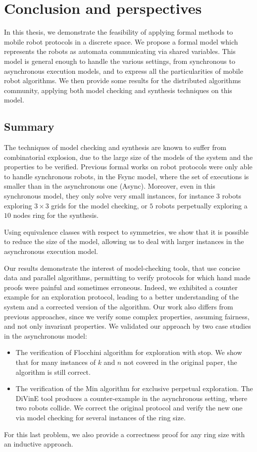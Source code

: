 
\chapter{Conclusion and perspectives}
In this thesis, we demonstrate the feasibility of applying formal methods to mobile robot protocols in a discrete space.
We propose a formal model which represents the robots as automata communicating via shared variables. 
This model is general enough to handle the various settings, from synchronous to asynchronous execution models, and to express all the particularities of mobile robot algorithms.
We then provide some results for the distributed algorithms community, applying both model checking and synthesis techniques on this model.
\section*{Summary}

The techniques of model checking and synthesis are known to suffer from combinatorial explosion, due to the large size of the models of the system and the properties to be verified. 
Previous formal works on robot protocols were only able to handle synchronous robots, in the Fsync model, where the set of executions is smaller than in the asynchronous one (Async). 
Moreover, even in this synchronous model, they only solve very small instances, for instance 3 robots exploring $3\times 3$ grids for the model checking, or $5$ robots perpetually exploring a $10$ nodes ring for the synthesis.

Using equivalence classes with respect to symmetries, we show that it is possible to reduce the size of the model, 
allowing us to deal with  larger instances in the asynchronous execution model.

Our results demonstrate the interest of model-checking tools, that use concise data and parallel algorithms, 
permitting to verify protocols for which hand made proofs were painful 
and sometimes erroneous. Indeed, we exhibited a counter example for an exploration protocol, leading to a better understanding of the system 
and a corrected version of the algorithm. Our work also differs from previous approaches, since we verify some complex properties, assuming fairness, and not only invariant properties. 
We validated our approach by two case studies in the asynchronous model: 
\begin{itemize}
\item The verification of Flocchini algorithm for exploration with stop.
We show that for many instances of $k$ and $n$ not covered in the original paper, the algorithm is still correct.
\item The verification of the Min algorithm for exclusive perpetual exploration. 
The DiVinE tool produces a counter-example in the asynchronous setting, where two robots collide.
 We correct the original protocol and verify the new one via model checking for several instances of the ring size. 
 \end{itemize}
 For this last problem, we also provide a correctness proof for any ring size with an inductive approach.



